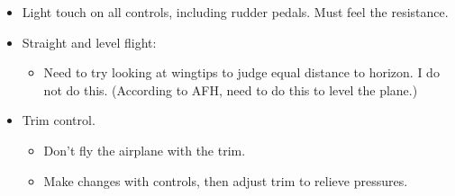 \documentclass[letterpaper,10pt,titlepage]{article}
\begin{document}
\begin{itemize}
\item Light touch on all controls, including rudder pedals.  Must feel the
      resistance.
\item Straight and level flight:
	  \begin{itemize}
	  \item Need to try looking at wingtips to judge equal distance to horizon.  I do
	        not do this.  (According to AFH, need to do this to level the plane.)
	  \end{itemize}
\item Trim control.
	  \begin{itemize}
	  \item Don't fly the airplane with the trim.
	  \item Make changes with controls, then adjust trim to relieve pressures.
	  \end{itemize}


\end{itemize}
\end{document}
